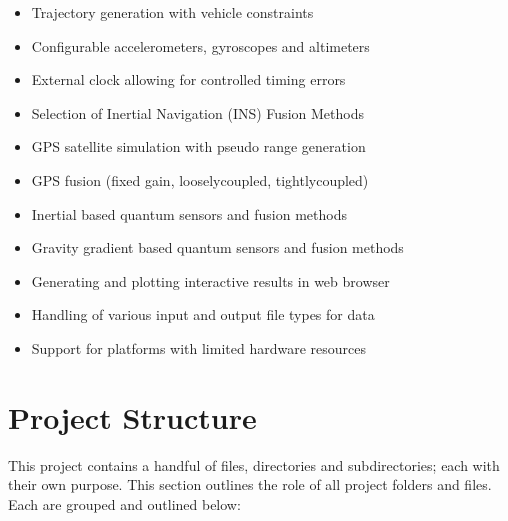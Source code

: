 \documentclass[letterpaper,10pt,english]{sphinxmanual}
\begin{document}
\begin{itemize}
\item {} 
\sphinxAtStartPar
Trajectory generation with vehicle constraints

\item {} 
\sphinxAtStartPar
Configurable accelerometers, gyroscopes and altimeters

\item {} 
\sphinxAtStartPar
External clock allowing for controlled timing errors

\item {} 
\sphinxAtStartPar
Selection of Inertial Navigation (INS) Fusion Methods

\item {} 
\sphinxAtStartPar
GPS satellite simulation with pseudo range generation

\item {} 
\sphinxAtStartPar
GPS fusion (fixed gain, loosely\sphinxhyphen{}coupled, tightly\sphinxhyphen{}coupled)

\item {} 
\sphinxAtStartPar
Inertial based quantum sensors and fusion methods

\item {} 
\sphinxAtStartPar
Gravity gradient based quantum sensors and fusion methods

\item {} 
\sphinxAtStartPar
Generating and plotting interactive results in web browser

\item {} 
\sphinxAtStartPar
Handling of various input and output file types for data

\item {} 
\sphinxAtStartPar
Support for platforms with limited hardware resources

\end{itemize}

\sphinxstepscope


\section{Project Structure}
\label{\detokenize{usage/structure:project-structure}}\label{\detokenize{usage/structure::doc}}
\sphinxAtStartPar
This project contains a handful of files, directories and sub\sphinxhyphen{}directories; each with their own purpose.
This section outlines the role of all project folders and files. Each are grouped and outlined below:
\end{document}
